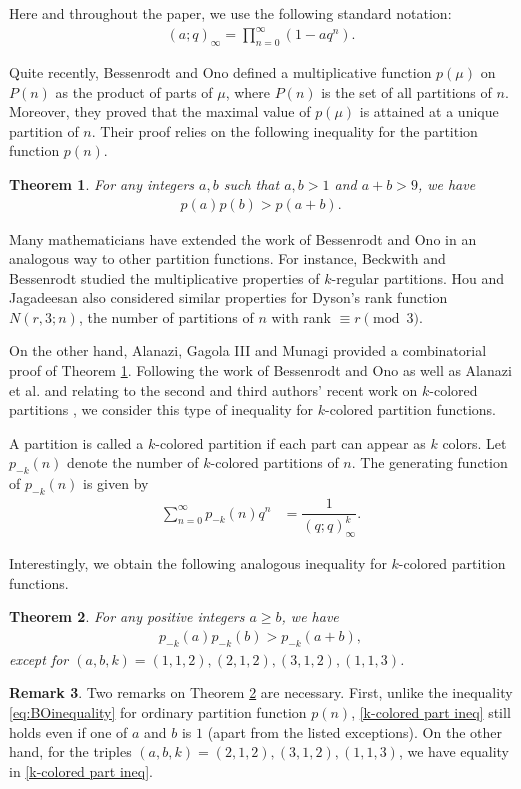 \documentclass[12pt,reqno]{amsart}
\numberwithin{equation}{section}
\theoremstyle{plain}
\newtheorem{theorem}{Theorem}[section]
\theoremstyle{definition}
\newtheorem{remark}[theorem]{Remark}
\begin{document}
Here and throughout the paper, we use the following standard notation:
\begin{align*}
(a;q)_{\infty}=\prod_{n=0}^{\infty}(1-aq^{n}).
\end{align*}

Quite recently, Bessenrodt and Ono \cite{BO2016} defined a multiplicative function $p(\mu)$ on $P(n)$ as the product of parts of $\mu$, where $P(n)$ is the set of all partitions of $n$. Moreover, they proved that the maximal value of $p(\mu)$ is attained at a unique partition of $n$. Their proof relies on the following inequality for the partition function $p(n)$.

\begin{theorem}\label{part fun ineq}
For any integers $a,b$ such that $a,b>1$ and $a+b>9$, we have
\begin{align}\label{eq:BOinequality}
p(a)p(b)>p(a+b).
\end{align}
\end{theorem}

Many mathematicians have extended the work of Bessenrodt and Ono in an analogous way to other partition functions. For instance, Beckwith and Bessenrodt \cite{BB2016} studied the multiplicative properties of $k$-regular partitions. Hou and Jagadeesan \cite{HJ2017} also considered similar properties for Dyson's rank function $N(r,3;n)$, the number of partitions of $n$ with rank $\equiv r\pmod{3}$.

On the other hand, Alanazi, Gagola III and Munagi \cite{AGM2016} provided a combinatorial proof of Theorem \ref{part fun ineq}. Following the work of Bessenrodt and Ono as well as Alanazi et al. and relating to the second and third authors' recent work on $k$-colored partitions \cite{FT2017}, we consider this type of inequality for $k$-colored partition functions.

A partition is called a $k$-colored partition if each part can appear as $k$ colors. Let $p_{-k}(n)$ denote the number of $k$-colored partitions of $n$. The generating function of $p_{-k}(n)$ is given by
\begin{align}\label{k-gene func}
\sum_{n=0}^{\infty}p_{-k}(n)q^{n} &=\dfrac{1}{(q;q)_{\infty}^{k}}.
\end{align}

Interestingly, we obtain the following analogous inequality for $k$-colored partition functions.
\begin{theorem}\label{analog theorem}
For any positive integers $a\ge b$, we have
\begin{align}\label{k-colored part ineq}
p_{-k}(a)p_{-k}(b)>p_{-k}(a+b),
\end{align}
except for $(a,b,k)=(1,1,2), (2,1,2), (3,1,2), (1,1,3)$.
\end{theorem}
\begin{remark}\label{rmk}
Two remarks on Theorem \ref{analog theorem} are necessary. First, unlike the inequality \eqref{eq:BOinequality} for ordinary partition function $p(n)$, \eqref{k-colored part ineq} still holds even if one of $a$ and $b$ is $1$ (apart from the listed exceptions). On the other hand, for the triples $(a,b,k)=(2,1,2), (3,1,2), (1,1,3)$, we have equality in \eqref{k-colored part ineq}.
\end{remark}
\end{document}
